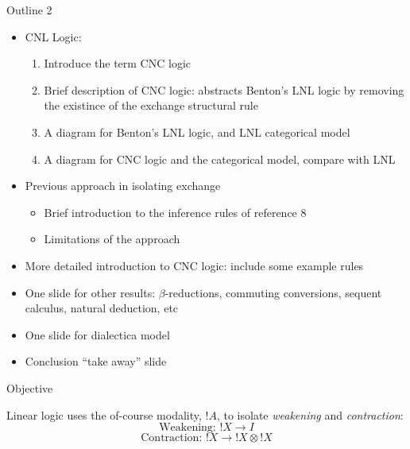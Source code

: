\documentclass{beamer}
\begin{document}
\begin{frame}{Outline 2}
\begin{itemize}
\item CNL Logic:
      \begin{enumerate}
      \item Introduce the term CNC logic
      \item Brief description of CNC logic: abstracts Benton's LNL logic by
            removing the existince of the exchange structural rule
      \item A diagram for Benton's LNL logic, and LNL categorical model
      \item A diagram for CNC logic and the categorical model, compare with 
            LNL
      \end{enumerate}
\item Previous approach in isolating exchange
      \begin{itemize}
      \item Brief introduction to the inference rules of reference 8
      \item Limitations of the approach
      \end{itemize}
\item More detailed introduction to CNC logic: include some example rules
\item One slide for other results: $\beta$-reductions, commuting
      conversions, sequent calculus, natural deduction, etc
\item One slide for dialectica model
\item Conclusion ``take away'' slide
\end{itemize}
\end{frame}


\begin{frame}{Objective}

Linear logic uses the of-course modality, $!A$, to isolate
\textit{weakening} and \textit{contraction}:
$$\mbox{Weakening: }!X \rightarrow I$$
$$\mbox{Contraction: }!X \rightarrow !X \otimes !X$$


\end{frame}
\end{document}
